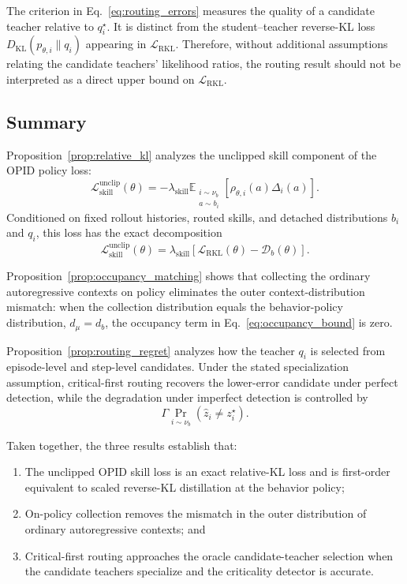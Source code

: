 The criterion in Eq.~\ref{eq:routing_errors} measures the quality of a
candidate teacher relative to \(q_i^\star\). It is distinct from the
student--teacher reverse-KL loss
\(D_{\mathrm{KL}}(p_{\theta,i}\|q_i)\) appearing in
\(\mathcal L_{\mathrm{RKL}}\). Therefore, without additional assumptions
relating the candidate teachers' likelihood ratios, the routing result
should not be interpreted as a direct upper bound on
\(\mathcal L_{\mathrm{RKL}}\).


\subsection{Summary}
\label{app:theory_scope}

Proposition~\ref{prop:relative_kl} analyzes the unclipped skill component
of the OPID policy loss:
\begin{equation*}
 \mathcal L_{\mathrm{skill}}^{\mathrm{unclip}}(\theta)
 =
 -
 \lambda_{\mathrm{skill}}
 \mathbb E_{\substack{i\sim\nu_b\\a\sim b_i}}
 \left[
   \rho_{\theta,i}(a)\Delta_i(a)
 \right].
\end{equation*}
Conditioned on fixed rollout histories, routed skills, and detached
distributions \(b_i\) and \(q_i\), this loss has the exact decomposition
\begin{equation*}
 \mathcal L_{\mathrm{skill}}^{\mathrm{unclip}}(\theta)
 =
 \lambda_{\mathrm{skill}}
 \left[
   \mathcal L_{\mathrm{RKL}}(\theta)
   -
   \mathcal D_b(\theta)
 \right].
\end{equation*}

Proposition~\ref{prop:occupancy_matching}  shows that collecting the ordinary autoregressive
contexts on policy eliminates the outer context-distribution mismatch:
when the collection distribution equals the behavior-policy distribution,
\(d_\mu=d_b\), the occupancy term in
Eq.~\ref{eq:occupancy_bound} is zero. 

Proposition~\ref{prop:routing_regret} analyzes how the teacher \(q_i\) is
selected from episode-level and step-level candidates. Under the stated
specialization assumption, critical-first routing recovers the lower-error
candidate under perfect detection, while the degradation under imperfect
detection is controlled by
\begin{equation*}
 \Gamma
 \Pr_{i\sim\nu_b}
 \left(
   \widehat z_i\ne z_i^\star
 \right).
\end{equation*}

Taken together, the three results establish that:

\begin{enumerate}
 \item The unclipped OPID skill loss is an exact relative-KL loss and is
 first-order equivalent to scaled reverse-KL distillation at the behavior
 policy;

 \item On-policy collection removes the mismatch in the outer distribution
 of ordinary autoregressive contexts; and

 \item Critical-first routing approaches the oracle candidate-teacher
 selection when the candidate teachers specialize and the criticality
 detector is accurate.
\end{enumerate}